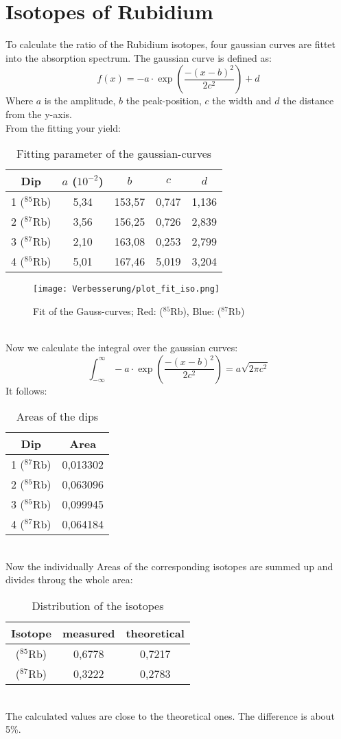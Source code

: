 \newpage\section{Isotopes of Rubidium}
To calculate the ratio of the Rubidium isotopes, four gaussian curves are fittet into the absorption spectrum.
The gaussian curve is defined as:
\begin{equation}
    f(x)=-a\cdot\exp\left(\frac{-(x-b)^2}{2c^2}\right)+d
\end{equation}
Where $a$ is the amplitude, $b$ the peak-position, $c$ the width and $d$ the distance from the y-axis.\\
From the fitting your yield:
\begin{table}[h]
    \centering\begin{tabular}{c|cccc}
        Dip & $a$ ($10^{-2}$)& $b$ & $c$ & $d$\\\hline
        1 ($^{85}$Rb)&5,34&153,57&0,747&1,136\\
        2 ($^{87}$Rb)&3,56&156,25&0,726&2,839\\
        3 ($^{87}$Rb)&2,10&163,08&0,253&2,799\\
        4 ($^{85}$Rb)&5,01&167,46&5,019&3,204
    \end{tabular}
    \caption{Fitting parameter of the gaussian-curves}
\end{table}
\begin{figure}[h]
    \centering\texttt{[image: Verbesserung/plot\_fit\_iso.png]}
    \caption{Fit of the Gauss-curves; Red: ($^{85}$Rb), Blue: ($^{87}$Rb)}
\end{figure}\\
Now we calculate the integral over the gaussian curves:
\begin{equation}
    \int_{-\infty}^\infty -a\cdot\exp\left(\frac{-(x-b)^2}{2c^2}\right)=a\sqrt{2\pi c^2}
\end{equation}\newpage
It follows:
\begin{table}[h]
    \centering\begin{tabular}{c|c}
        Dip & Area\\\hline
        1 ($^{87}$Rb)&0,013302\\
        2 ($^{85}$Rb)&0,063096\\
        3 ($^{85}$Rb)&0,099945\\
        4 ($^{87}$Rb)&0,064184
    \end{tabular}
    \caption{Areas of the dips}
\end{table}\\
Now the individually Areas of the corresponding isotopes are summed up and divides throug the whole area:
\begin{table}[h]
    \centering\begin{tabular}{c|cc}
        Isotope & measured & theoretical\\\hline
        ($^{85}$Rb)&0,6778&0,7217\\
        ($^{87}$Rb)&0,3222&0,2783
    \end{tabular}
    \caption{Distribution of the isotopes}
\end{table}\\
The calculated values are close to the theoretical ones.
The difference is about 5\%.\newpage
